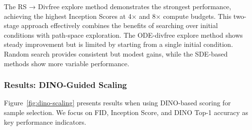 \documentclass{article}
\begin{document}
The RS → Divfree explore method demonstrates the strongest performance, achieving the highest Inception Scores at 4× and 8× compute budgets. This two-stage approach effectively combines the benefits of searching over initial conditions with path-space exploration. The ODE-divfree explore method shows steady improvement but is limited by starting from a single initial condition. Random search provides consistent but modest gains, while the SDE-based methods show more variable performance.

\subsubsection{Results: DINO-Guided Scaling}

Figure~\ref{fig:dino-scaling} presents results when using DINO-based scoring for sample selection. We focus on FID, Inception Score, and DINO Top-1 accuracy as key performance indicators.
\end{document}
